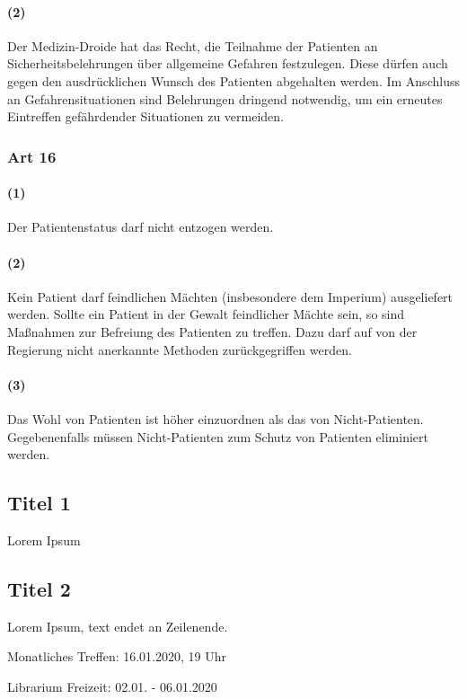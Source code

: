 \paragraph{(2)} Der Medizin-Droide hat das Recht, die Teilnahme der Patienten an Sicherheitsbelehrungen über allgemeine Gefahren festzulegen. Diese dürfen auch gegen den ausdrücklichen Wunsch des Patienten abgehalten werden. Im Anschluss an Gefahrensituationen sind Belehrungen dringend notwendig, um ein erneutes Eintreffen gefährdender Situationen zu vermeiden.

\subsubsection{Art 16}
\paragraph{(1)} Der Patientenstatus darf nicht entzogen werden.
\paragraph{(2)} Kein Patient darf feindlichen Mächten (insbesondere dem Imperium) ausgeliefert werden. Sollte ein Patient in der Gewalt feindlicher Mächte sein, so sind Maßnahmen zur Befreiung des Patienten zu treffen. Dazu darf auf von der Regierung nicht anerkannte Methoden zurückgegriffen werden.
\paragraph{(3)} Das Wohl von Patienten ist höher einzuordnen als das von Nicht-Patienten. Gegebenenfalls müssen Nicht-Patienten zum Schutz von Patienten eliminiert werden.


\subsection{Titel 1}
Lorem Ipsum

\subsection{Titel 2}
Lorem Ipsum, text endet an Zeilenende.


\begin{termine}
  \item Monatliches Treffen: 16.01.2020, 19 Uhr
  \item Librarium Freizeit: 02.01. - 06.01.2020
\end{termine}


